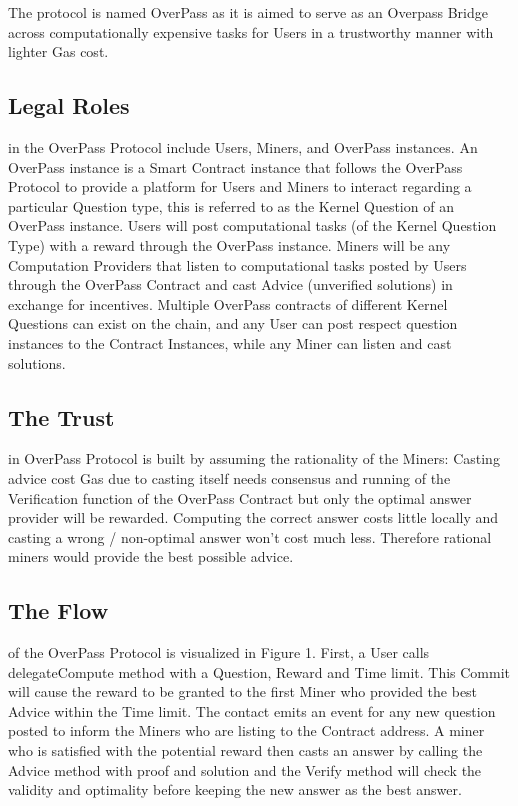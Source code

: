The protocol is named OverPass as it is aimed to serve as an Overpass Bridge across computationally expensive tasks for Users in a trustworthy manner with lighter Gas cost.
\subsection{Legal Roles} in the OverPass Protocol include Users, Miners, and OverPass instances. An OverPass instance is a Smart Contract instance that follows the OverPass Protocol to provide a platform for Users and Miners to interact regarding a particular Question type, this is referred to as the Kernel Question of an OverPass instance. Users will post computational tasks (of the Kernel Question Type) with a reward through the OverPass instance. Miners will be any Computation Providers that listen to computational tasks posted by Users through the OverPass Contract and cast Advice (unverified solutions) in exchange for incentives. Multiple OverPass contracts of different Kernel Questions can exist on the chain, and any User can post respect question instances to the Contract Instances, while any Miner can listen and cast solutions. 
\subsection{The Trust} in OverPass Protocol is built by assuming the rationality of the Miners: Casting advice cost Gas due to casting itself needs consensus and running of the Verification function of the OverPass Contract but only the optimal answer provider will be rewarded. Computing the correct answer costs little locally and casting a wrong / non-optimal answer won’t cost much less. Therefore rational miners would provide the best possible advice. 
\subsection{The Flow} of the OverPass Protocol is visualized in Figure 1. First, a User calls delegateCompute method with a Question, Reward and Time limit. This Commit will cause the reward to be granted to the first Miner who provided the best Advice within the Time limit. The contact emits an event for any new question posted to inform the Miners who are listing to the Contract address. A miner who is satisfied with the potential reward then casts an answer by calling the Advice method with proof and solution and the Verify method will check the validity and optimality before keeping the new answer as the best answer. 

